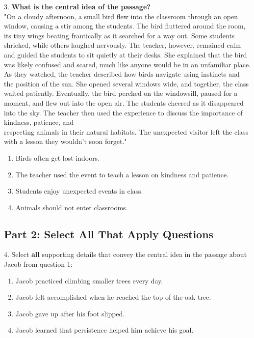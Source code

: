 \documentclass[12pt]{article}
\begin{document}
3. \textbf{What is the central idea of the passage?\\}
"On a cloudy afternoon, a small bird flew into the classroom through an open window, causing a stir among the students. The bird fluttered around the room, its tiny wings beating frantically as it searched for a way out. Some students shrieked, while others laughed nervously. The teacher, however, remained calm and guided the students to sit quietly at their desks. She explained that the bird was likely confused and scared, much like anyone would be in an unfamiliar place. As they watched, the teacher described how birds navigate using instincts and the position of the sun. She opened several windows wide, and together, the class waited patiently. Eventually, the bird perched on the windowsill, paused for a moment, and flew out into the open air. The students cheered as it disappeared into the sky. The teacher then used the experience to discuss the importance of kindness, patience, and \\respecting animals in their natural habitats. The unexpected visitor left the class with a lesson they wouldn’t soon forget."  
\begin{enumerate}[label=\Alph*.]
    \item Birds often get lost indoors.  
    \item The teacher used the event to teach a lesson on kindness and patience.  
    \item Students enjoy unexpected events in class.  
    \item Animals should not enter classrooms.  
\end{enumerate}

\vspace{1cm}

\subsection*{Part 2: Select All That Apply Questions}

4. Select \textbf{all} supporting details that convey the central idea in the passage about Jacob from question 1:  
\begin{enumerate}[label=\Alph*.]
    \item Jacob practiced climbing smaller trees every day.  
    \item Jacob felt accomplished when he reached the top of the oak tree.  
    \item Jacob gave up after his foot slipped.  
    \item Jacob learned that persistence helped him achieve his goal.  
\end{enumerate}
\end{document}
